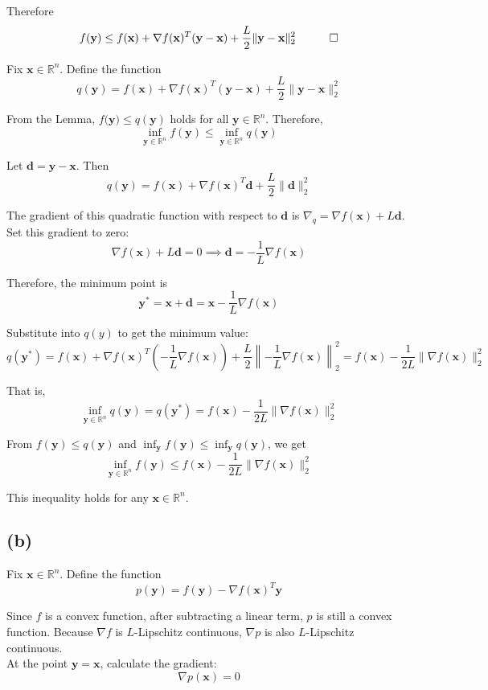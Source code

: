 \documentclass{article}
\begin{document}
Therefore
$$
f(\mathbf{y}) \leq f(\mathbf{x}) + \nabla f(\mathbf{x})^T (\mathbf{y} - \mathbf{x}) + \frac{L}{2} \|\mathbf{y} - \mathbf{x}\|_2^2  \quad \qed
$$

Fix $ \mathbf{x} \in \mathbb{R}^n $. Define the function
$$
q(\mathbf{y})=f(\mathbf{x}) + \nabla f(\mathbf{x})^T(\mathbf{y} - \mathbf{x})+\frac{L}{2}\|\mathbf{y} - \mathbf{x}\|_2^2
$$

From the Lemma, $ f\mathbf{(y})\leq q(\mathbf{y}) $ holds for all $ \mathbf{y} \in \mathbb{R}^n $. Therefore,
$$
\inf_{\mathbf{y} \in \mathbb{R}^n}f(\mathbf{y})\leq\inf_{\mathbf{y} \in \mathbb{R}^n}q(\mathbf{y})
$$

Let $ \mathbf{d} = \mathbf{y} - \mathbf{x} $. Then
$$
q(\mathbf{y})=f(\mathbf{x})+\nabla f(\mathbf{x})^T \mathbf{d}+\frac{L}{2}\|\mathbf{d}\|_2^2
$$

The gradient of this quadratic function with respect to $ \mathbf{d} $ is $ \nabla_q = \nabla f(\mathbf{x})+L\mathbf{d} $. Set this gradient to zero:
$$
\nabla f(\mathbf{x})+L\mathbf{d} = 0\implies \mathbf{d} = -\frac{1}{L}\nabla f(\mathbf{x})
$$

Therefore, the minimum point is
$$
\mathbf{y}^*=\mathbf{x} + \mathbf{d}=\mathbf{x}-\frac{1}{L}\nabla f(\mathbf{x})
$$

Substitute into $ q(y) $ to get the minimum value:
$$
q(\mathbf{y}^*)=f(\mathbf{x})+\nabla f(\mathbf{x})^T\left(-\frac{1}{L}\nabla f(\mathbf{x})\right)+\frac{L}{2}\left\|-\frac{1}{L}\nabla f(\mathbf{x})\right\|_2^2=f(\mathbf{x})-\frac{1}{2L}\|\nabla f(\mathbf{x})\|_2^2
$$

That is,
$$
\inf_{\mathbf{y} \in \mathbb{R}^n}q(\mathbf{y})=q(\mathbf{y}^*)=f(\mathbf{x})-\frac{1}{2L}\|\nabla f(\mathbf{x})\|_2^2
$$

From $ f(\mathbf{y})\leq q(\mathbf{y}) $ and $ \inf_{\mathbf{y}}f(\mathbf{y})\leq\inf_{\mathbf{y}}q(\mathbf{y}) $, we get
$$
\inf_{\mathbf{y} \in \mathbb{R}^n}f(\mathbf{y})\leq f(\mathbf{x})-\frac{1}{2L}\|\nabla f(\mathbf{x})\|_2^2
$$

This inequality holds for any $ \mathbf{x} \in \mathbb{R}^n $. 

\subsection*{(b)}
Fix $ \mathbf{x} \in \mathbb{R}^n $. Define the function
$$
p(\mathbf{y})=f(\mathbf{y})-\nabla f(\mathbf{x})^T \mathbf{y}
$$

Since $ f $ is a convex function, after subtracting a linear term, $ p $ is still a convex function.
Because $ \nabla f $ is $ L $-Lipschitz continuous, $ \nabla p $ is also $ L $-Lipschitz continuous.
\\
At the point $ \mathbf{y} = \mathbf{x} $, calculate the gradient:
$$
\nabla p(\mathbf{x})=0
$$
\end{document}
